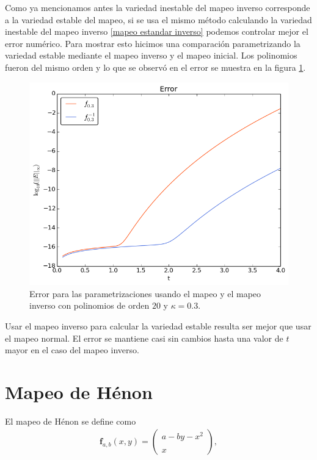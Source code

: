 Como ya mencionamos antes la variedad inestable del mapeo inverso corresponde a la variedad estable del mapeo, si se usa el mismo método calculando la variedad inestable del mapeo inverso \ref{mapeo estandar inverso} podemos controlar mejor el error numérico. Para mostrar esto hicimos una comparación parametrizando la variedad estable mediante el mapeo inverso y el mapeo inicial. Los polinomios fueron del mismo orden y lo que se observó en el error se muestra en la figura \ref{erroresinverso}.


\begin{figure}[H]
\centering
\includegraphics[scale=0.6]{mapeoinver}
\caption{Error para las parametrizaciones usando el mapeo y el mapeo inverso con polinomios de orden $20$ y $\kappa=0.3$. }
\label{erroresinverso}
\end{figure}

Usar el mapeo inverso para calcular la variedad estable resulta ser mejor que usar el mapeo normal. El error se mantiene casi sin cambios hasta una valor de $t$ mayor en el caso del mapeo inverso. 




\section{Mapeo de Hénon}
El mapeo de Hénon se define como \cite{devaney}
\begin{eqnarray}
\mathbf{f}_{a,b}(x,y)=\left( \begin{array}{lcc}
             a-by-x^{2}\\
             \\ x
             \end{array}
             \right), \label{Henon}
\end{eqnarray}

